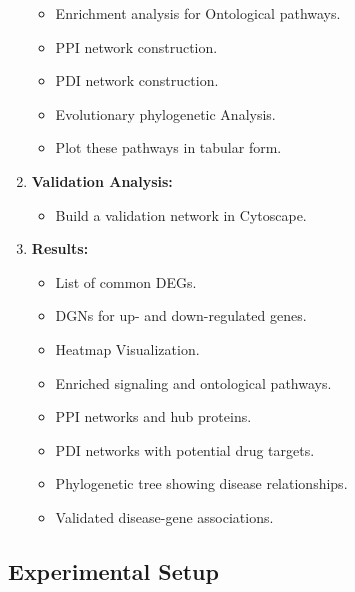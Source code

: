 \begin{enumerate}
\begin{itemize}
        \item Enrichment analysis for Ontological pathways.
        \item PPI network construction.
        \item PDI network construction.
        \item Evolutionary phylogenetic Analysis.
        \item Plot these pathways in tabular form.
    \end{itemize}
    \item \textbf{Validation Analysis:}
    \begin{itemize}
        \item Build a validation network in Cytoscape.
    \end{itemize}
    \item \textbf{Results:}
    \begin{itemize}
        \item List of common DEGs.
        \item DGNs for up- and down-regulated genes.
        \item Heatmap Visualization.
        \item Enriched signaling and ontological pathways.
        \item PPI networks and hub proteins.
        \item PDI networks with potential drug targets.
        \item Phylogenetic tree showing disease relationships.
        \item Validated disease-gene associations.
    \end{itemize}
\end{enumerate}

\vspace*{-\parskip}
\subsection{Experimental Setup}
\label{sec:experimental_setup}

